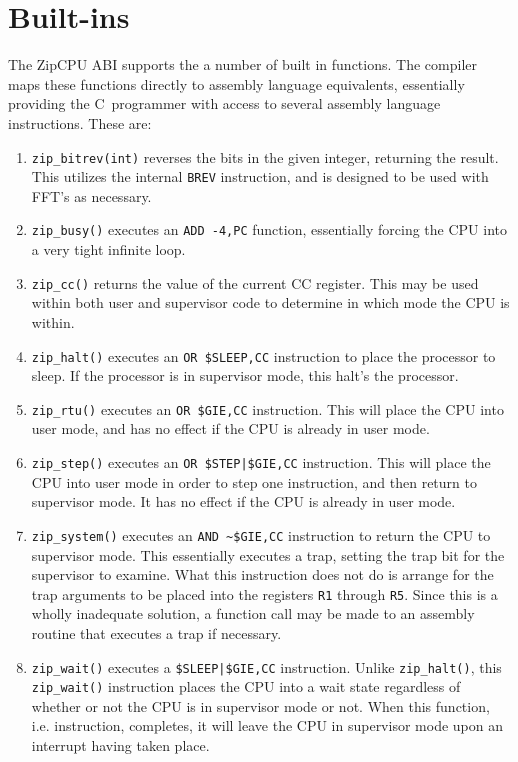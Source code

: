 \documentclass{gqtekspec}
\begin{document}
\section{Built-ins}\label{sec:abi-builtin}
The ZipCPU ABI supports the a number of built in functions.  The compiler
maps these functions directly to assembly language equivalents, essentially 
providing the C~programmer with access to several assembly language
instructions.  These are:
\begin{enumerate}
\item {\tt zip\_bitrev(int)} reverses the bits in the given integer, returning
	the result.  This utilizes the internal {\tt BREV} instruction, and is
	designed to be used with FFT's as necessary.
\item {\tt zip\_busy()} executes an {\tt ADD -4,PC} function, essentially
	forcing the CPU into a very tight infinite loop.
\item {\tt zip\_cc()} returns the value of the current CC register.  This may
	be used within both user and supervisor code to determine in which
	mode the CPU is within.
\item {\tt zip\_halt()} executes an \hbox{\tt OR \$SLEEP,CC} instruction to
	place the processor to sleep.  If the processor is in supervisor mode,
	this halt's the processor.
\item {\tt zip\_rtu()} executes an \hbox{\tt OR \$GIE,CC} instruction.  This
	will place the CPU into user mode, and has no effect if the CPU is
	already in user mode.
\item {\tt zip\_step()} executes an \hbox{\tt OR \$STEP|\$GIE,CC} instruction.
	This will place the CPU into user mode in order to step one instruction,
	and then return to supervisor mode.
	It has no effect if the CPU is already in user mode.
\item {\tt zip\_system()} executes an \hbox{\tt AND \textasciitilde\$GIE,CC}
	instruction to return the CPU to supervisor mode.  This essentially
	executes a trap, setting the trap bit for the supervisor to examine. 
	What this instruction does not do is arrange for the trap arguments to
	be placed into the  registers {\tt R1} through {\tt R5}.  Since this is
	a wholly inadequate solution, a function call may be made to an
	assembly routine that executes a trap if necessary.
\item {\tt zip\_wait()} executes a \hbox{\tt \$SLEEP|\$GIE,CC} instruction.
	Unlike {\tt zip\_halt()}, this {\tt zip\_wait()} instruction places
	the CPU into a wait state regardless of whether or not the CPU is
	in supervisor mode or not.   When this function, i.e. instruction,
	completes, it will leave the CPU in supervisor mode upon an interrupt
	having taken place.


\end{enumerate}
\end{document}
